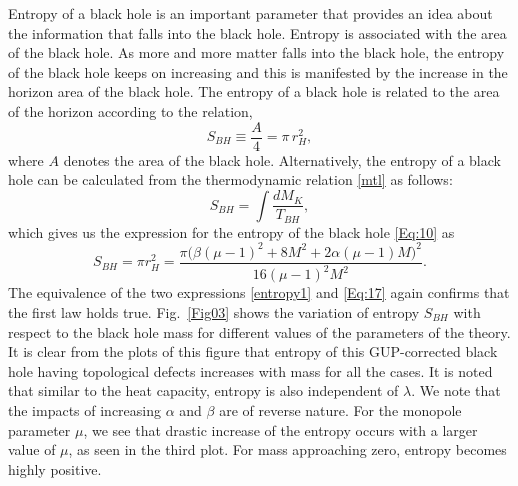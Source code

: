 \documentclass[aps,amsmath,amssymb,showpacs,showkeys]{revtex4}
\begin{document}
Entropy of a black hole is an important parameter that provides an idea about 
the information that falls into the black hole. Entropy is associated with the 
area of the black hole. As more and more matter falls into the black hole, the 
entropy of the black hole keeps on increasing and this is manifested by 
the increase in the horizon area of the black hole. 
 The entropy of a black hole is related to the area of the horizon 
according to the relation,
\begin{equation}
    S_{BH}\equiv\frac{A}{4}=\pi\, r_H^2,
    \label{entropy1}
\end{equation}
where $A$ denotes the area of the black hole. Alternatively, the entropy of a 
black hole can be calculated from the thermodynamic relation \eqref{mtl} as 
follows:
\begin{equation}
  S_{BH}=\int \frac{dM_K}{T_{BH}},
\label{eq:16}
\end{equation}
which gives us the expression for the entropy of the black hole \eqref{Eq:10} as
\begin{equation}
 S_{BH}=\pi r_H^2= \frac{\pi  \Big(\beta  (\mu -1)^2+8 M^2+2 \alpha  (\mu -1) M\Big)^2}{16 (\mu -1)^2 M^2}.
\label{Eq:17}
\end{equation}
 The equivalence of the two expressions \eqref{entropy1} and \eqref{Eq:17} 
again confirms that the first law holds true.
Fig.\ \ref{Fig03} shows the variation of entropy $S_{BH}$ with respect to the
 black hole mass for different values of the parameters of the theory. 
 It is clear from the plots of this figure that entropy of this 
GUP-corrected black hole having topological defects increases with mass for 
all the cases. It is noted that similar to the heat capacity, entropy is also 
independent of $\lambda$. We note that the impacts of increasing $\alpha$ 
and $\beta$ are of reverse nature. For the monopole parameter $\mu$, we see 
that drastic increase of the entropy occurs with a larger value of $\mu$, 
as seen in the third plot. For mass approaching zero, entropy becomes highly 
positive. 
\end{document}
